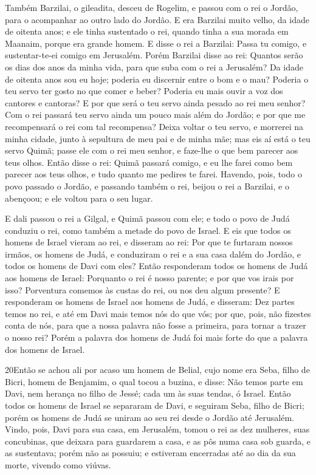 Também Barzilai, o gileadita, desceu de Rogelim, e passou com o
rei o Jordão, para o acompanhar ao outro lado do Jordão. E
era Barzilai muito velho, da idade de oitenta anos; e ele tinha
sustentado o rei, quando tinha a sua morada em Maanaim, porque era
grande homem. E disse o rei a Barzilai: Passa tu comigo, e
sustentar-te-ei comigo em Jerusalém. Porém Barzilai disse ao
rei: Quantos serão os dias dos anos da minha vida, para que suba com
o rei a Jerusalém? Da idade de oitenta anos sou eu hoje;
poderia eu discernir entre o bom e o mau? Poderia o teu servo ter
gosto no que comer e beber? Poderia eu mais ouvir a voz dos cantores
e cantoras? E por que será o teu servo ainda pesado ao rei meu
senhor? Com o rei passará teu servo ainda um pouco mais além
do Jordão; e por que me recompensará o rei com tal recompensa?
Deixa voltar o teu servo, e morrerei na minha cidade, junto à
sepultura de meu pai e de minha mãe; mas eis aí está o teu servo
Quimã; passe ele com o rei meu senhor, e faze-lhe o que bem parecer
aos teus olhos. Então disse o rei: Quimã passará comigo, e eu
lhe farei como bem parecer aos teus olhos, e tudo quanto me pedires
te farei. Havendo, pois, todo o povo passado o Jordão, e
passando também o rei, beijou o rei a Barzilai, e o abençoou; e ele
voltou para o seu lugar.

E dali passou o rei a Gilgal, e Quimã passou com ele; e todo o
povo de Judá conduziu o rei, como também a metade do povo de Israel.
E eis que todos os homens de Israel vieram ao rei, e disseram
ao rei: Por que te furtaram nossos irmãos, os homens de Judá, e
conduziram o rei e a sua casa dalém do Jordão, e todos os homens de
Davi com eles? Então responderam todos os homens de Judá aos
homens de Israel: Porquanto o rei é nosso parente; e por que vos
irais por isso? Porventura comemos às custas do rei, ou nos deu
algum presente? E responderam os homens de Israel aos homens
de Judá, e disseram: Dez partes temos no rei, e até em Davi mais
temos nós do que vós; por que, pois, não fizestes conta de nós, para
que a nossa palavra não fosse a primeira, para tornar a trazer o
nosso rei? Porém a palavra dos homens de Judá foi mais forte do que
a palavra dos homens de Israel.

\medskip

\lettrine{20} Então se achou ali por acaso um homem de Belial,
cujo nome era Seba, filho de Bicri, homem de Benjamim, o qual tocou
a buzina, e disse: Não temos parte em Davi, nem herança no filho de
Jessé; cada um às suas tendas, ó Israel. Então todos os homens
de Israel se separaram de Davi, e seguiram Seba, filho de Bicri;
porém os homens de Judá se uniram ao seu rei desde o Jordão até
Jerusalém. Vindo, pois, Davi para sua casa, em Jerusalém, tomou
o rei as dez mulheres, suas concubinas, que deixara para guardarem a
casa, e as pôs numa casa sob guarda, e as sustentava; porém não as
possuiu; e estiveram encerradas até ao dia da sua morte, vivendo
como viúvas.

